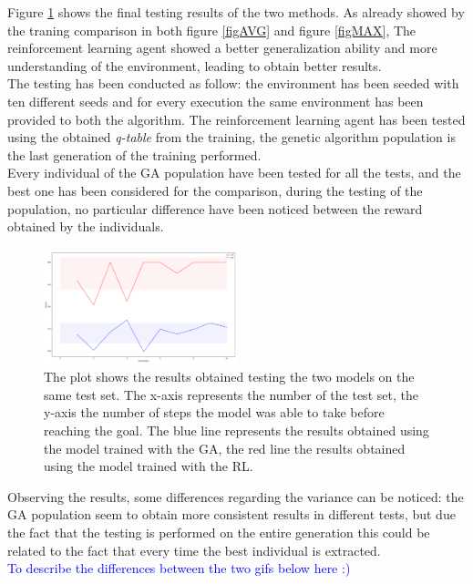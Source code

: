 Figure \ref{figRLvsGA} shows the final testing results of the two methods. As already showed by the traning comparison in both figure \ref{figAVG} and figure \ref{figMAX}, The reinforcement learning agent showed a better generalization ability and more understanding of the environment, leading to obtain better results.\\
The testing has been conducted as follow: the environment has been seeded with ten different seeds and for every execution the same environment has been provided to both the algorithm.
The reinforcement learning agent has been tested using the obtained \textit{q-table} from the training, the genetic algorithm population is the last generation of the training performed.\\
Every individual of the GA population have been tested for all the tests, and the best one has been considered for the comparison, during the testing of the population, no particular difference have been noticed between the reward obtained by the individuals.

\begin{figure}[H]
	\centering
	\includegraphics [width=0.5\textwidth]{Images/GAvRL_backup.png}
	\caption{The plot shows the results obtained testing the two models on the same test set. The x-axis represents the number of the test set, the y-axis the number of steps the model was able to take before reaching the goal. The blue line represents the results obtained using the model trained with the GA, the red line the results obtained using the model trained with the RL.}
	\label{figRLvsGA}
\end{figure}

Observing the results, some differences regarding the variance can be noticed: the GA population seem to obtain more consistent results in different tests, but due the fact that the testing is performed on the entire generation this could be related to the fact that every time the best individual is extracted.\\
	
\textcolor{blue}{To describe the differences between the two gifs below here :)}
	
